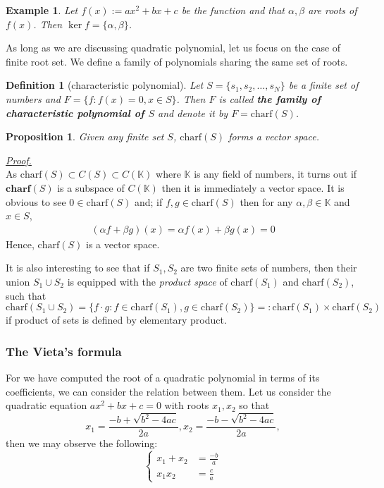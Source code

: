 \documentclass[12pt]{article}
\newtheorem{definition}{Definition}[section]
\newtheorem*{proposition}{Proposition}
\newtheorem*{example}{Example}
\renewenvironment{proof}[1][Proof]{\begin{snugshade*} \underline{\textit{{#1}.}}\\}{\hfill \qedsymbol \end{snugshade*}}
\begin{document}
    \begin{example}
        Let $f(x):=ax^2+bx+c$ be the function and that $\alpha,\beta$ are roots of $f(x)$. Then $\ker{f}=\{\alpha,\beta\}$.
    \end{example}

    As long as we are discussing quadratic polynomial, let us focus on the case of finite root set. We define a family of polynomials sharing the same set of roots. 

    \begin{definition}[characteristic polynomial]
        Let $S=\{s_1,s_2,\dots,s_N\}$ be a finite set of numbers and $F=\{f: f(x)=0, x\in S\}$. Then $F$ is called \textbf{the family of characteristic polynomial of $S$} and denote it by $F=\mathrm{charf}(S)$.
    \end{definition}

    \begin{proposition}
        Given any finite set $S$, $\mathrm{charf}(S)$ forms a vector space.
    \end{proposition}

    \begin{proof}
        As $\mathrm{charf}(S)\subset C(S)\subset C(\mathbb{K})$ where $\mathbb{K}$ is any field of numbers, it turns out if $\mathbf{charf}(S)$ is a subspace of $C(\mathbb{K})$ then it is immediately a vector space. It is obvious to see $0\in \mathrm{charf}(S)$ and; if $f,g\in\mathrm{charf}(S)$ then for any $\alpha,\beta\in\mathbb{K}$ and $x\in S$, \begin{align*}
            (\alpha f + \beta g)(x)=\alpha f(x)+\beta g(x)=0
        \end{align*}
        Hence, $\mathrm{charf}(S)$ is a vector space.
    \end{proof}

    It is also interesting to see that if $S_1,S_2$ are two finite sets of numbers, then their union $S_1\cup S_2$ is equipped with the \textit{product space} of $\mathrm{charf}(S_1)$ and $\mathrm{charf}(S_2)$, such that \[\mathrm{charf}(S_1\cup S_2)=\{f\cdot g:f\in\mathrm{charf}(S_1),g\in\mathrm{charf}(S_2)\}=:\mathrm{charf}(S_1)\times \mathrm{charf}(S_2)\] if product of sets is defined by elementary product.

    \subsubsection*{The Vieta's formula}

    For we have computed the root of a quadratic polynomial in terms of its coefficients, we can consider the relation between them. Let us consider the quadratic equation $ax^2+bx+c=0$ with roots $x_1,x_2$ so that \[x_1=\frac{-b+\sqrt{b^2-4ac}}{2a}, x_2=\frac{-b-\sqrt{b^2-4ac}}{2a},\] then we may observe the following: \[\begin{cases}
        x_1+x_2&=\frac{-b}{a}\\
        x_1x_2&=\frac{c}{a}
    \end{cases}\]
\end{document}
